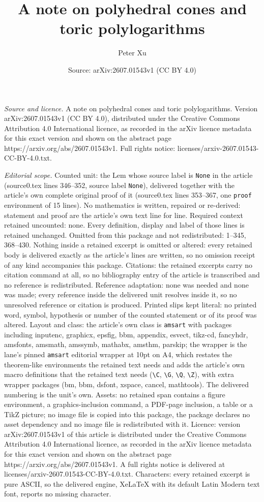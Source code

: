 \documentclass[10pt,a4paper]{amsart}
\title[A note on polyhedral cones and toric polylogarithms]{A note on polyhedral cones and toric polylogarithms}
\author{Peter Xu}
\date{Source: arXiv:2607.01543v1 (CC BY 4.0)}
\begin{document}
\maketitle

\noindent\emph{Source and licence.} A note on polyhedral cones and toric polylogarithms. Version arXiv:2607.01543v1 (CC BY 4.0), distributed under the Creative Commons Attribution 4.0 International licence, as recorded in the arXiv licence metadata for this exact version and shown on the abstract page https://arxiv.org/abs/2607.01543v1. Full rights notice: licenses/arxiv-2607.01543-CC-BY-4.0.txt.\par\smallskip

\noindent\textit{Editorial scope.} Counted unit: the Lem whose source label is \texttt{None} in the article (source0.tex lines 346--352, source label \texttt{None}), delivered together with the article's own complete original proof of it (source0.tex lines 353--367, one \texttt{proof} environment of 15 lines). No mathematics is written, repaired or re-derived: statement and proof are the article's own text line for line. Required context retained uncounted: none. Every definition, display and label of those lines is retained unchanged. Omitted from this package and not redistributed: 1--345, 368--430. Nothing inside a retained excerpt is omitted or altered: every retained body is delivered exactly as the article's lines are written, so no omission receipt of any kind accompanies this package. Citations: the retained excerpts carry no citation command at all, so no bibliography entry of the article is transcribed and no reference is redistributed. Reference adaptation: none was needed and none was made; every reference inside the delivered unit resolves inside it, so no unresolved reference or citation is produced. Printed slips kept literal: no printed word, symbol, hypothesis or number of the counted statement or of its proof was altered. Layout and class: the article's own class is \texttt{amsart} with packages including inputenc, graphicx, epsfig, bbm, appendix, esvect, tikz-cd, fancyhdr, amsfonts, amsmath, amssymb, mathabx, amsthm, parskip; the wrapper is the lane's pinned \texttt{amsart} editorial wrapper at 10pt on A4, which restates the theorem-like environments the retained text needs and adds the article's own macro definitions that the retained text needs (\texttt{\textbackslash C}, \texttt{\textbackslash G}, \texttt{\textbackslash Q}, \texttt{\textbackslash Z}), with extra wrapper packages (bm, bbm, dsfont, xspace, cancel, mathtools). The delivered numbering is the unit's own. Assets: no retained span contains a figure environment, a graphics-inclusion command, a PDF-page inclusion, a table or a TikZ picture; no image file is copied into this package, the package declares no asset dependency and no image file is redistributed with it. Licence: version arXiv:2607.01543v1 of this article is distributed under the Creative Commons Attribution 4.0 International licence, as recorded in the arXiv licence metadata for this exact version and shown on the abstract page https://arxiv.org/abs/2607.01543v1. A full rights notice is delivered at licenses/arxiv-2607.01543-CC-BY-4.0.txt. Characters: every retained excerpt is pure ASCII, so the delivered engine, XeLaTeX with its default Latin Modern text font, reports no missing character.
\end{document}
